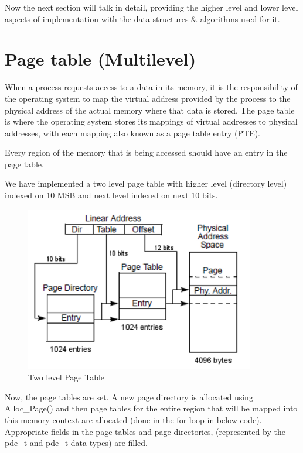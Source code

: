 \documentclass[11pt]{article}
\begin{document}
Now the next section will talk in detail, providing the higher level and lower level aspects of implementation with the data structures \& algorithms used for it.

\section{Page table (Multilevel)}

When a process requests access to a data in its memory, it is the responsibility of the operating system to map the virtual address provided by the process to the physical address of the actual memory where that data is stored. The page table is where the operating system stores its mappings of virtual addresses to physical addresses, with each mapping also known as a page table entry (PTE).

Every region of the memory that is being accessed should have an entry in the page table.

We have implemented a two level page table with higher level (directory level) indexed on 10 MSB and next level indexed on next 10 bits.


\begin{figure}[ht!]
	\centering
	\includegraphics[width=100mm]{p4.png}
	\caption{Two level Page Table}
\end{figure}


Now, the page tables are set. A new page directory is allocated using Alloc\_Page() and then
page tables for the entire region that will be mapped into this memory context are allocated (done in the for loop in below code). Appropriate fields in the page tables and page directories, (represented by the pde\_t and pde\_t data-types) are filled.
\end{document}
